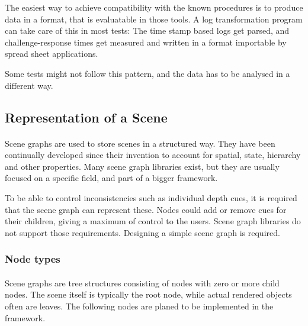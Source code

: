 The easiest way to achieve compatibility with the known procedures is to produce data in a format, that is evaluatable in those tools. A log transformation program can take care of this in most tests: The time stamp based logs get parsed, and challenge-response times get measured and written in a format importable by spread sheet applications.

Some tests might not follow this pattern, and the data has to be analysed in a different way.


\subsection{Representation of a Scene\label{sceneRep}}
\paragraph{}
Scene graphs are used to store scenes in a structured way. They have been continually developed since their invention\cite{scenegraph} to account for spatial, state, hierarchy and other properties. Many scene graph libraries exist, but they are usually focused on a specific field, and part of a bigger framework.

To be able to control inconsistencies such as individual depth cues, it is required that the scene graph can represent these. Nodes could add or remove cues for their children, giving a maximum of control to the users. Scene graph libraries do not support those requirements. Designing a simple scene graph is required.

\subsubsection{Node types}
\paragraph{}
Scene graphs are tree structures consisting of nodes with zero or more child nodes. The scene itself is typically the root node, while actual rendered objects often are leaves. The following nodes are planed to be implemented in the framework.

